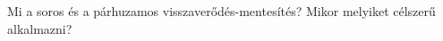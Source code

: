 \begin{example}

Mi a soros és a párhuzamos visszaverődés-mentesítés? Mikor melyiket célszerű alkalmazni?

\tcbline
\vspace{1mm}

\solution

\end{example}
